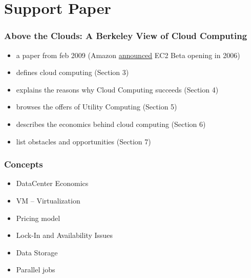 \documentclass[bigger,hyperref={colorlinks=true, urlcolor=red, plainpages=false, pdfpagelabels, bookmarksnumbered}]{beamer}
\begin{document}
\section{Support Paper}
\label{sec-4}
\begin{frame}
\frametitle{Above the Clouds: A Berkeley View of Cloud Computing}
\label{sec-4-1}


\begin{itemize}
\item a paper from feb 2009 (Amazon \href{http://aws.typepad.com/aws/2006/08/amazon_ec2_beta.html}{announced} EC2 Beta opening in 2006)
\item defines cloud computing (Section 3)
\item explains the reasons why Cloud Computing succeeds (Section 4)
\item browses the offers of Utility Computing (Section 5)
\item describes the economics behind cloud computing (Section 6)
\item list obstacles and opportunities (Section 7)
\end{itemize}
\end{frame}
\begin{frame}
\frametitle{Concepts}
\label{sec-4-2}
\begin{itemize}

\item DataCenter Economics
\label{sec-4-2-1}%

\item VM -- Virtualization
\label{sec-4-2-2}%

\item Pricing model
\label{sec-4-2-3}%

\item Lock-In and Availability Issues
\label{sec-4-2-4}%

\item Data Storage
\label{sec-4-2-5}%

\item Parallel jobs
\label{sec-4-2-6}%


\end{itemize} %
\end{frame}
\end{document}

